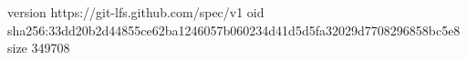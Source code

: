 version https://git-lfs.github.com/spec/v1
oid sha256:33dd20b2d44855ce62ba1246057b060234d41d5d5fa32029d7708296858bc5e8
size 349708
